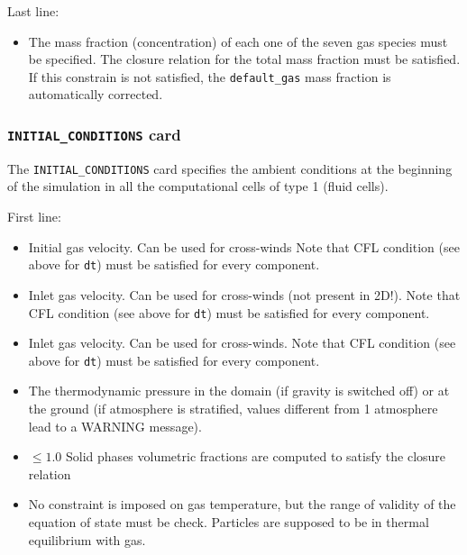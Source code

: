 Last line:

\begin{itemize}

\item
{}
{The mass fraction (concentration) of each one of the seven gas species must be
specified. The closure relation for the total mass fraction must be satisfied.
If this constrain is not satisfied, the {\tt default\_gas} mass fraction is
automatically corrected.}

\end{itemize}

\subsubsection{{\tt INITIAL\_CONDITIONS} card}

The {\tt INITIAL\_CONDITIONS} card specifies the ambient conditions at 
the beginning of the simulation in all the computational cells of
type 1 (fluid cells).

First line:

\begin{itemize}
\item
{}
{Initial gas velocity. Can be used for cross-winds Note that CFL condition (see above for {\tt dt}) 
must be satisfied for every component.}

\item
{}
{Inlet gas velocity. Can be used for cross-winds (not present in 2D!).
Note that CFL condition (see above for {\tt dt}) 
must be satisfied for every component.}

\item
{}
{Inlet gas velocity. Can be used for cross-winds.
Note that CFL condition (see above for {\tt dt}) 
must be satisfied for every component.}

\item
{}
{The thermodynamic pressure in the domain (if gravity is switched off) or
at the ground (if atmosphere is stratified, values different from 1 atmosphere
lead to a WARNING message).}

\item
{}
{ $\le 1.0$}
{Solid phases volumetric fractions are computed to satisfy the closure relation}

\item
{}
{No constraint is imposed on gas temperature, but the range of validity
of the equation of state must be check. Particles are supposed to be in thermal
equilibrium with gas.}
\end{itemize}

